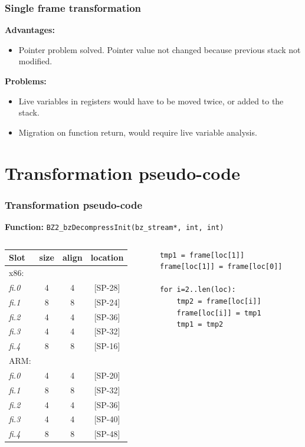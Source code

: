\documentclass[10pt]{beamer}
\begin{document}
\begin{frame}
\frametitle{Single frame transformation}

\textbf{Advantages:}
\begin{itemize}
\item Pointer problem solved. Pointer value not changed because previous stack not modified.
\end{itemize}
\textbf{Problems:}
\begin{itemize}
\item Live variables in registers would have to be moved twice, or added to the stack.
\item Migration on function return, would require live variable analysis.
\end{itemize}
\end{frame}

\section{Transformation pseudo-code}
\begin{frame}[fragile]
\frametitle{Transformation pseudo-code}

\textbf{Function:} \verb|BZ2_bzDecompressInit(bz_stream*, int, int)|

\begin{columns}

\begin{column}{0.4\textwidth}

\begin{tabular}{lccc}
\textbf{Slot} & \textbf{size} & \textbf{align} & \textbf{location} \\
\hline
x86: & & & \\
\hline
  \textit{fi.0} & 4 & 4 & [SP-28] \\
  \textit{fi.1} & 8 & 8 & [SP-24] \\
  \textit{fi.2} & 4 & 4 & [SP-36] \\
  \textit{fi.3} & 4 & 4 & [SP-32] \\
  \textit{fi.4} & 8 & 8 & [SP-16] \\
\hline
ARM: & & & \\
\hline
  \textit{fi.0} & 4 & 4 & [SP-20] \\
  \textit{fi.1} & 8 & 8 & [SP-32] \\
  \textit{fi.2} & 4 & 4 & [SP-36] \\
  \textit{fi.3} & 4 & 4 & [SP-40] \\
  \textit{fi.4} & 8 & 8 & [SP-48] \\
\end{tabular}
\end{column}

\begin{column}{0.5\textwidth}
\begin{lstlisting}
tmp1 = frame[loc[1]]
frame[loc[1]] = frame[loc[0]]

for i=2..len(loc):
    tmp2 = frame[loc[i]]
    frame[loc[i]] = tmp1
    tmp1 = tmp2
\end{lstlisting}

\end{column}
\end{columns}

\end{frame}
\end{document}

